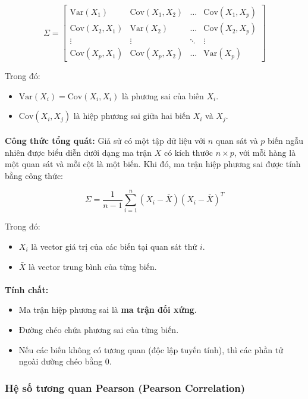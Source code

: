 \[
\Sigma =
\begin{bmatrix}
\text{Var}(X_1) & \text{Cov}(X_1, X_2) & \dots & \text{Cov}(X_1, X_p) \\
\text{Cov}(X_2, X_1) & \text{Var}(X_2) & \dots & \text{Cov}(X_2, X_p) \\
\vdots & \vdots & \ddots & \vdots \\
\text{Cov}(X_p, X_1) & \text{Cov}(X_p, X_2) & \dots & \text{Var}(X_p)
\end{bmatrix}
\]

Trong đó:
\begin{itemize}
\item \( \text{Var}(X_i) = \text{Cov}(X_i, X_i) \) là phương sai của biến \( X_i \).
\item \( \text{Cov}(X_i, X_j) \) là hiệp phương sai giữa hai biến \( X_i \) và \( X_j \).
\end{itemize}
\paragraph{}{\textbf{Công thức tổng quát:}
Giả sử có một tập dữ liệu với \( n \) quan sát và \( p \) biến ngẫu nhiên được biểu diễn dưới dạng ma trận \( X \) có kích thước \( n \times p \), với mỗi hàng là một quan sát và mỗi cột là một biến. Khi đó, ma trận hiệp phương sai được tính bằng công thức:}

\[
\Sigma = \frac{1}{n - 1} \sum_{i=1}^{n} (X_i - \bar{X})(X_i - \bar{X})^T
\]

Trong đó:
\begin{itemize}
\item \( X_i \) là vector giá trị của các biến tại quan sát thứ \( i \).
\item\( \bar{X} \) là vector trung bình của từng biến.
\end{itemize}
\paragraph{}{\textbf{Tính chất:}}
\begin{itemize}
    \item Ma trận hiệp phương sai là \textbf{ma trận đối xứng}.
    \item Đường chéo chứa phương sai của từng biến.
    \item Nếu các biến không có tương quan (độc lập tuyến tính), thì các phần tử ngoài đường chéo bằng 0.
\end{itemize}

\subsubsection{Hệ số tương quan Pearson (Pearson Correlation)}

